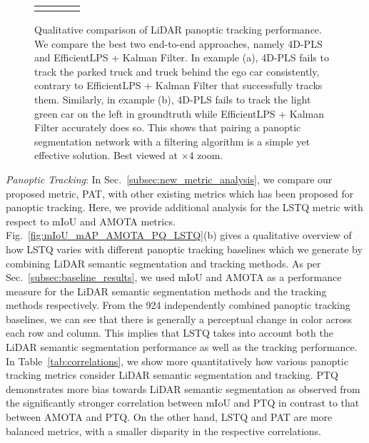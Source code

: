 \documentclass[letterpaper, 10 pt, journal, twoside]{IEEEtran}
\newcommand{\tableref}[1]{Table~\ref{#1}}
\newcommand{\secref}[1]{Sec.~\ref{#1}}
\newcommand{\figref}[1]{Fig.~\ref{#1}}
\begin{document}
\begin{figure*}
{\begin{tabular}{P{0.4cm}P{5.5cm}P{5.5cm}P{5.5cm}}
\\
{}& &  &  \\
\end{tabular}}
\caption{Qualitative comparison of LiDAR panoptic tracking performance. We compare the best two end-to-end approaches, namely 4D-PLS and EfficientLPS + Kalman Filter. In example (a), 4D-PLS fails to track the parked truck and truck behind the ego car consistently, contrary to EfficientLPS + Kalman Filter that successfully tracks them. Similarly, in example (b), 4D-PLS fails to track the light green car on the left in groundtruth while EfficientLPS + Kalman Filter accurately does so. This shows that pairing a panoptic segmentation network with a filtering algorithm is a simple yet effective solution. Best viewed at $\times 4$ zoom.}
\label{fig:tracking_ablation}
\end{figure*}

\noindent\textit{Panoptic Tracking}: In \secref{subsec:new_metric_analysis}, we compare our proposed metric, PAT, with other existing metrics which has been proposed for panoptic tracking. Here, we provide additional analysis for the LSTQ metric with respect to mIoU and AMOTA metrics. \figref{fig:mIoU_mAP_AMOTA_PQ_LSTQ}(b) gives a qualitative overview of how LSTQ varies with different panoptic tracking baselines which we generate by combining LiDAR semantic segmentation and tracking methods. As per \secref{subsec:baseline_results}, we used mIoU and AMOTA as a performance measure for the LiDAR semantic segmentation methods and the tracking methods respectively. From the 924 independently combined panoptic tracking baselines, we can see that there is generally a perceptual change in color across each row and column. This implies that LSTQ takes into account both the LiDAR semantic segmentation performance as well as the tracking performance. In \tableref{tab:correlations}, we show more quantitatively how various panoptic tracking metrics consider LiDAR semantic segmentation and tracking. PTQ demonstrates more bias towards LiDAR semantic segmentation as observed from the significantly stronger correlation between mIoU and PTQ in contrast to that between AMOTA and PTQ. On the other hand, LSTQ and PAT are more balanced metrics, with a smaller disparity in the respective correlations.
\end{document}
